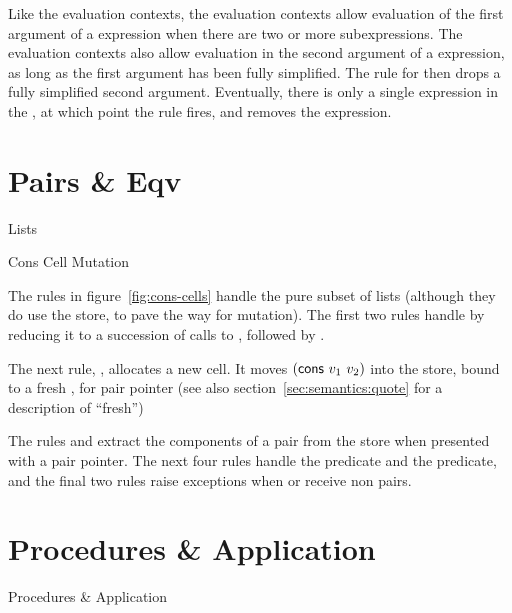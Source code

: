 Like the  evaluation contexts, the 
evaluation contexts allow evaluation of the first argument of a
 expression when there are two or more subexpressions.
The  evaluation contexts also allow evaluation in the
second argument of a  expression, as long as the first
argument has been fully simplified. The  rule for
 then drops a fully simplified second argument.
Eventually, there is only a single expression in the ,
at which point the  rule fires, and removes the
 expression.

\section{Pairs \& Eqv}

\beginfig
\begin{center}

\end{center}
\caption{Lists}\label{fig:cons-cells}
\endfig

\beginfig
\begin{center}

\end{center}
\caption{Cons Cell Mutation}\label{fig:cons-cell-mutation}
\endfig

The rules in figure~\ref{fig:cons-cells} handle the pure subset of
lists (although they do use the store, to pave the way for mutation).
The first two rules handle  by reducing it to a
succession of calls to , followed by .

The next rule, , allocates a new  cell.
It moves $(\textnormal{\textsf{cons}}~v_1~v_2)$ into the store, bound to a fresh
, for pair pointer (see also section~\ref{sec:semantics:quote} for a description of ``fresh'')

The rules  and  extract the components of a pair from the store when presented with a pair pointer. The next four rules handle the  predicate and the  predicate, and the final two rules raise exceptions when  or  receive non pairs.

\section{Procedures \& Application}

\beginfig
\begin{center}

\end{center}
\caption{Procedures \& Application}\label{fig:procedure-application}
\endfig

